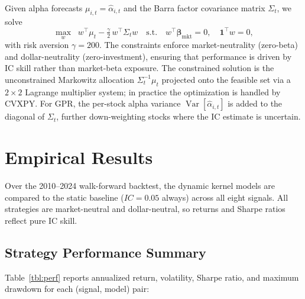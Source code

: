 \documentclass[11pt]{amsart}
\begin{document}
Given alpha forecasts $\mu_{i,t} = \hat{\alpha}_{i,t}$ and the Barra
factor covariance matrix $\Sigma_t$, we solve
\[
  \max_{w} \;\; w^\top \mu_t - \tfrac{\gamma}{2}\,w^\top \Sigma_t w
  \quad \text{s.t.} \quad
  w^\top \boldsymbol{\beta}_{\mathrm{mkt}} = 0,
  \quad
  \mathbf{1}^\top w = 0,
\]
with risk aversion $\gamma = 200$.  The constraints enforce
market-neutrality (zero-beta) and dollar-neutrality (zero-investment),
ensuring that performance is driven by IC skill rather than market-beta
exposure.  The constrained solution is the unconstrained Markowitz
allocation $\Sigma_t^{-1}\mu_t$ projected onto the feasible set via a
$2\times 2$ Lagrange multiplier system; in practice the optimization is
handled by CVXPY.  For GPR, the per-stock alpha variance
$\operatorname{Var}[\hat{\alpha}_{i,t}]$ is added to the diagonal of
$\Sigma_t$, further down-weighting stocks where the IC estimate is
uncertain.

\section{Empirical Results}

Over the 2010--2024 walk-forward backtest, the dynamic kernel models are
compared to the static baseline ($IC = 0.05$ always) across all eight signals.
All strategies are market-neutral and dollar-neutral, so returns and Sharpe
ratios reflect pure IC skill.

\subsection{Strategy Performance Summary}

Table~\ref{tbl:perf} reports annualized return, volatility, Sharpe ratio, and
maximum drawdown for each (signal, model) pair:
\end{document}
